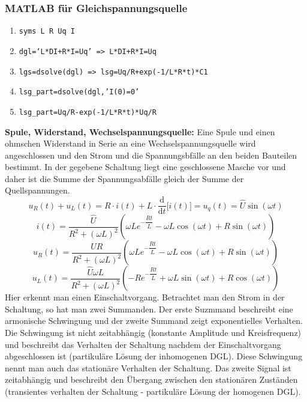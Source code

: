 \subsubsection{MATLAB für Gleichspannungsquelle}
\begin{enumerate}[$\texttt{>}\texttt{>}$]
\item {\color{red}\texttt{syms L R Uq I}}
\item {\color{red}\texttt{dgl=`L*DI+R*I=Uq' => L*DI+R*I=Uq}}
\item {\color{red}\texttt{lgs=dsolve(dgl) => lsg=Uq/R+exp(-1/L*R*t)*C1}}
\item {\color{red}\texttt{lsg\_part=dsolve(dgl,'I(0)=0'}}
\item {\color{red}\texttt{lsg\_part=Uq/R-exp(-1/L*R*t)*Uq/R}}
\end{enumerate}
\textbf{Spule, Widerstand, Wechselspannungsquelle:} Eine Spule und einen ohmschen Widerstand in Serie an eine Wechselspannungsquelle wird angeschlossen und den Strom und die Spannungsbfälle an den beiden Bauteilen bestimmt. In der gegebene Schaltung liegt eine geschlossene Masche vor und daher ist die Summe der Spannungsabfälle gleich der Summe der Quellspannungen.
\begin{equation}
\boxed{u_R\left(t\right)+u_L\left(t\right)=R\cdot i\left(t\right)+L\cdot \dfrac{\text{d}}{\text{d}t}\Big[i\left(t\right)\Big]=u_q\left(t\right)=\hat{U}\sin\left(\omega t\right)}
\end{equation}
\begin{equation}
\boxed{i\left(t\right)=\dfrac{\hat{U}}{R^2+\left(\omega L\right)^2}\left(\omega Le^{-\dfrac{Rt}{L}}-\omega L\cos\left(\omega t\right)+R\sin\left(\omega t\right)\right)}
\end{equation}
\begin{equation}
\boxed{u_R\left(t\right)=\dfrac{\hat{U}R}{R^2+\left(\omega L\right)^2}\left(\omega L e^{-\dfrac{Rt}{L}}-\omega L\cos\left(\omega t\right)+R\sin\left(\omega t\right)\right)}
\end{equation}
\begin{equation}
\boxed{u_L\left(t\right)=\dfrac{\hat{U}\omega L}{R^2+\left(\omega L\right)^2}\left(-R e^{-\dfrac{Rt}{L}}+\omega L\sin\left(\omega t\right)+R\cos\left(\omega t\right)\right)}
\end{equation}
Hier erkennt man einen Einschaltvorgang. Betrachtet man den Strom in der Schaltung, so hat man zwei Summanden. Der erste Suzmmand beschreibt eine armonische Schwingung und der zweite Summand zeigt exponentielles Verhalten. Die Schwingung ist nicht zeitabhängig (konstante Amplitude und Kreisfrequenz) und beschreibt das Verhalten der Schaltung nachdem der Einschaltvorgang abgeschlossen ist (partikuläre Lösung der inhomogenen DGL). Diese Schwingung nennt man auch das stationäre Verhalten der Schaltung. Das zweite Signal ist zeitabhängig und beschreibt den Übergang zwischen den stationären Zuständen (transientes verhalten der Schaltung - partikuläre Lösung der homogenen DGL).
